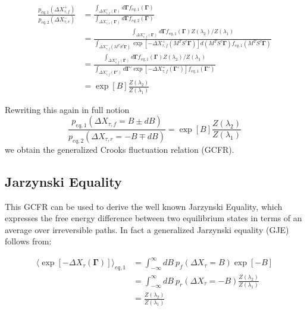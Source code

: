 \documentclass[a4paper,12pt,nofootinbib]{article}
\begin{document}
\begin{equation}
\begin{aligned}
\frac{p_{eq,1}(\Delta X_{\tau,f}^+)}{p_{eq,2}(\Delta X_{\tau,r}^-)}
&=\frac{\int_{\Delta X_{\tau,f}^+(\bm{\Gamma})} d\bm{\Gamma} f_{eq,1}(\bm{\Gamma})}{\int_{\Delta X_{\tau,r}^-(\bm{\Gamma})} d\bm{\Gamma} f_{eq,2}(\bm{\Gamma})} \\
&= \frac{\int_{\Delta X_{\tau,f}^+(\bm{\Gamma})} d\bm{\Gamma} f_{eq,1}(\bm{\Gamma})Z(\lambda_2)/Z(\lambda_1)}{\int_{\Delta X_{\tau,f}^+(M^T S^{\tau}\bm{\Gamma})} \exp[-\Delta X_{\tau,f}^+(M^T S^{\tau}\bm{\Gamma})] d(M^T S^{\tau}\bm{\Gamma}) f_{eq,1}(M^T S^{\tau}\bm{\Gamma})} \\
&=\frac{\int_{\Delta X_{\tau,f}^+(\bm{\Gamma})} d\bm{\Gamma} f_{eq,1}(\bm{\Gamma}) Z(\lambda_2)/Z(\lambda_1)}{\int_{\Delta X_{\tau,f}^+(\bm{\Gamma}')} d\bm{\Gamma}' \exp[-\Delta X_{\tau,f}^+(\bm{\Gamma}')] f_{eq,1}(\bm{\Gamma}')} \\
&= \exp[B] \frac{Z(\lambda_2)}{Z(\lambda_1)}
\end{aligned}
\end{equation}

Rewriting this again in full notion
\begin{equation}
\label{GCFR}
\frac{p_{eq,1}(\Delta X_{\tau,f}=B\pm dB)}{p_{eq,2}(\Delta X_{\tau,r}=-B\mp dB)}= \exp[B] \frac{Z(\lambda_2)}{Z(\lambda_1)}
\end{equation}
we obtain the generalized Crooks fluctuation relation (GCFR).

\subsection{Jarzynski Equality}
This GCFR can be used to derive the well known Jarzynski Equality, which expresses the free energy difference between two equilibrium states in terms of an average over irreversible paths.
In fact a generalized Jarzynski equality (GJE) follows from:

\begin{equation}
\begin{aligned}
  \langle \exp[-\Delta X_{\tau}(\bm{\Gamma})] \rangle_{eq,1} 
  &= \int_{-\infty}^{\infty} dB\ p_f(\Delta X_\tau =B)\exp[-B]\\
 &= \int_{-\infty}^{\infty} dB\ p_r(\Delta X_\tau =-B)\frac{Z(\lambda_2)}{Z(\lambda_1)}\\
 &=\frac{Z(\lambda_2)}{Z(\lambda_1)}
\end{aligned}
\end{equation}
\end{document}
